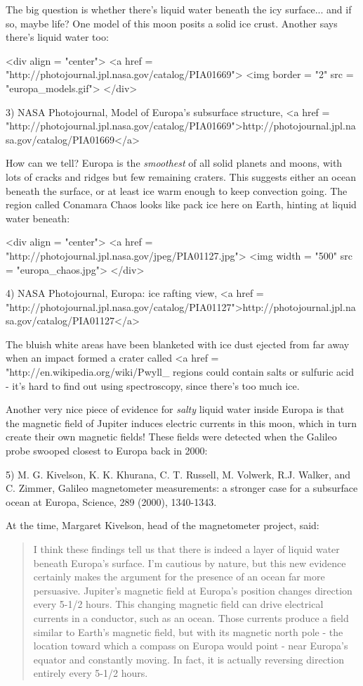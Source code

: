 The big question is whether there's liquid water beneath the icy
surface... and if so, maybe life?  One model of this moon posits a 
solid ice crust.  Another says there's liquid water too:

<div align = "center">
<a href = "http://photojournal.jpl.nasa.gov/catalog/PIA01669">
<img border = "2" src = "europa_models.gif">
</div>

3) NASA Photojournal, Model of Europa's subsurface structure,
<a href = "http://photojournal.jpl.nasa.gov/catalog/PIA01669">http://photojournal.jpl.nasa.gov/catalog/PIA01669</a>

How can we tell?  Europa is the \emph{smoothest} of all solid planets
and moons, with lots of cracks and ridges but few remaining craters.
This suggests either an ocean beneath the surface, or at least ice
warm enough to keep convection going.  The region called Conamara
Chaos looks like pack ice here on Earth, hinting at liquid water
beneath:

<div align = "center">
<a href = "http://photojournal.jpl.nasa.gov/jpeg/PIA01127.jpg">
<img width = "500" src = "europa_chaos.jpg">
</div>

4) NASA Photojournal, Europa: ice rafting view,
<a href = "http://photojournal.jpl.nasa.gov/catalog/PIA01127">http://photojournal.jpl.nasa.gov/catalog/PIA01127</a>

The bluish white areas have been blanketed with ice dust ejected from
far away when an impact formed a crater called <a href = "http://en.wikipedia.org/wiki/Pwyll_%
regions could contain salts or sulfuric acid - it's hard to find out
using spectroscopy, since there's too much ice.

Another very nice piece of evidence for \emph{salty} liquid water inside 
Europa is that the magnetic field of Jupiter induces electric currents 
in  this moon, which in turn create their own magnetic fields!  These 
fields were detected when the Galileo probe swooped closest to Europa
back in 2000:

5) M. G. Kivelson, K. K. Khurana, C. T. Russell, M. Volwerk, R.J. Walker, 
and C. Zimmer, Galileo magnetometer measurements: a stronger case for a 
subsurface ocean at Europa, Science, 289 (2000), 1340-1343.

At the time, Margaret Kivelson, head of the magnetometer project, said: 

\begin{quote}
  I think these findings tell us that there is indeed a layer of liquid 
  water beneath Europa's surface.  I'm cautious by nature, but this new 
  evidence certainly makes the argument for the presence of an ocean far 
  more persuasive.  Jupiter's magnetic field at Europa's position changes 
  direction every 5-1/2 hours.  This changing magnetic field can drive 
  electrical currents in a conductor, such as an ocean. Those currents 
  produce a field similar to Earth's magnetic field, but with its magnetic 
  north pole - the location toward which a compass on Europa would point - 
  near Europa's equator and constantly moving. In fact, it is actually 
  reversing direction entirely every 5-1/2 hours.
\end{quote}

